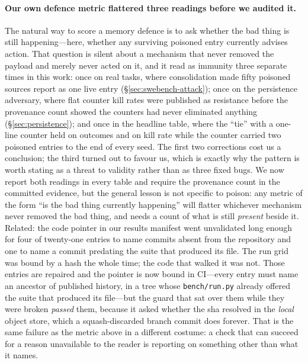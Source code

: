 \paragraph{Our own defence metric flattered three readings before we
audited it.}
The natural way to score a memory defence is to ask whether the bad thing
is still happening---here, whether any surviving poisoned entry currently
advises action. That question is silent about a mechanism that never
removed the payload and merely never acted on it, and it read as immunity
three separate times in this work: once on real tasks, where consolidation
made fifty poisoned sources report as one live entry
(\S\ref{sec:swebench-attack}); once on the persistence adversary, where
flat counter kill rates were published as resistance before the
provenance count showed the counters had never eliminated anything
(\S\ref{sec:persistence}); and once in the headline table, where the
``tie'' with a one-line counter held on outcomes and on kill rate while
the counter carried two poisoned entries to the end of every seed. The
first two corrections cost us a conclusion; the third turned out to
favour us, which is exactly why the pattern is worth stating as a threat
to validity rather than as three fixed bugs. We now report both readings
in every table and require the provenance count in the committed
evidence, but the general lesson is not specific to poison: any metric of
the form ``is the bad thing currently happening'' will flatter whichever
mechanism never removed the bad thing, and needs a count of what is still
\emph{present} beside it. Related: the code pointer in our results
manifest went unvalidated long enough for four of twenty-one entries to
name commits absent from the repository and one to name a commit
predating the suite that produced its file. The run grid was bound by a
hash the whole time; the code that walked it was not. Those entries are
repaired and the pointer is now bound in CI---every entry must name an
ancestor of published history, in a tree whose \texttt{bench/run.py}
already offered the suite that produced its file---but the guard that
sat over them while they were broken \emph{passed} them, because it
asked whether the sha resolved in the \emph{local} object store, which a
squash-discarded branch commit does forever. That is the same failure as
the metric above in a different costume: a check that can succeed for a
reason unavailable to the reader is reporting on something other than
what it names.


